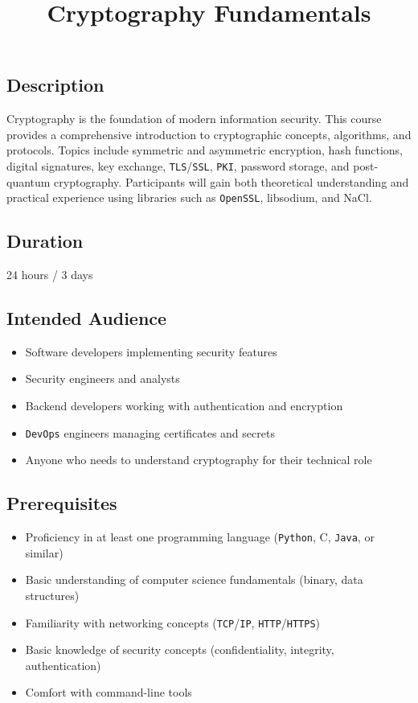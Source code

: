 \documentclass[
]{article}
\title{Cryptography Fundamentals}
\author{}
\date{}
\providecommand{\tightlist}{%
  \setlength{\itemsep}{0pt}\setlength{\parskip}{0pt}}
\begin{document}
\maketitle

\subsection{Description}\label{description}

Cryptography is the foundation of modern information security. This
course provides a comprehensive introduction to cryptographic concepts,
algorithms, and protocols. Topics include symmetric and asymmetric
encryption, hash functions, digital signatures, key exchange,
\texttt{TLS}/\texttt{SSL}, \texttt{PKI}, password storage, and
post-quantum cryptography. Participants will gain both theoretical
understanding and practical experience using libraries such as
\texttt{OpenSSL}, libsodium, and NaCl.

\subsection{Duration}\label{duration}

24 hours / 3 days

\subsection{Intended Audience}\label{intended-audience}

\begin{itemize}
\tightlist
\item
  Software developers implementing security features
\item
  Security engineers and analysts
\item
  Backend developers working with authentication and encryption
\item
  \texttt{DevOps} engineers managing certificates and secrets
\item
  Anyone who needs to understand cryptography for their technical role
\end{itemize}

\subsection{Prerequisites}\label{prerequisites}

\begin{itemize}
\tightlist
\item
  Proficiency in at least one programming language (\texttt{Python}, C,
  \texttt{Java}, or similar)
\item
  Basic understanding of computer science fundamentals (binary, data
  structures)
\item
  Familiarity with networking concepts (\texttt{TCP}/\texttt{IP},
  \texttt{HTTP}/\texttt{HTTPS})
\item
  Basic knowledge of security concepts (confidentiality, integrity,
  authentication)
\item
  Comfort with command-line tools
\end{itemize}
\end{document}
